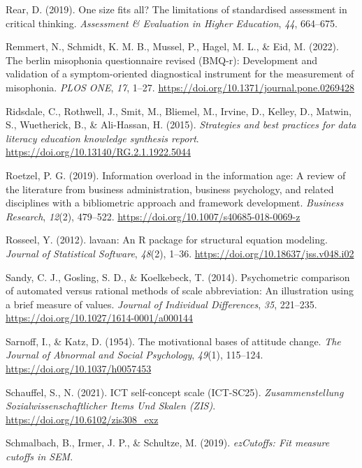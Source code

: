 \documentclass[
  12pt,
  a4paper,
  twoside]{article}
\newlength{\cslhangindent}
\newenvironment{CSLReferences}[2] %
 {\begin{list}{}{%
  \setlength{\itemindent}{0pt}
  \setlength{\leftmargin}{0pt}
  \setlength{\parsep}{0pt}
  \ifodd #1
   \setlength{\leftmargin}{\cslhangindent}
   \setlength{\itemindent}{-1\cslhangindent}
  \fi
  \setlength{\itemsep}{#2\baselineskip}}}
 {\end{list}}
\begin{document}
\begin{CSLReferences}{1}{0}
Rear, D. (2019). One size fits all? The limitations of standardised assessment in critical thinking. \emph{Assessment \& Evaluation in Higher Education}, \emph{44}, 664--675.

Remmert, N., Schmidt, K. M. B., Mussel, P., Hagel, M. L., \& Eid, M. (2022). The berlin misophonia questionnaire revised (BMQ-r): Development and validation of a symptom-oriented diagnostical instrument for the measurement of misophonia. \emph{PLOS ONE}, \emph{17}, 1--27. \url{https://doi.org/10.1371/journal.pone.0269428}

Ridsdale, C., Rothwell, J., Smit, M., Bliemel, M., Irvine, D., Kelley, D., Matwin, S., Wuetherick, B., \& Ali-Hassan, H. (2015). \emph{Strategies and best practices for data literacy education knowledge synthesis report}. \url{https://doi.org/10.13140/RG.2.1.1922.5044}

Roetzel, P. G. (2019). Information overload in the information age: A review of the literature from business administration, business psychology, and related disciplines with a bibliometric approach and framework development. \emph{Business Research}, \emph{12}(2), 479--522. \url{https://doi.org/10.1007/s40685-018-0069-z}

Rosseel, Y. (2012). {lavaan}: An {R} package for structural equation modeling. \emph{Journal of Statistical Software}, \emph{48}(2), 1--36. \url{https://doi.org/10.18637/jss.v048.i02}

Sandy, C. J., Gosling, S. D., \& Koelkebeck, T. (2014). Psychometric comparison of automated versus rational methods of scale abbreviation: An illustration using a brief measure of values. \emph{Journal of Individual Differences}, \emph{35}, 221--235. \url{https://doi.org/10.1027/1614-0001/a000144}

Sarnoff, I., \& Katz, D. (1954). The motivational bases of attitude change. \emph{The Journal of Abnormal and Social Psychology}, \emph{49}(1), 115--124. \url{https://doi.org/10.1037/h0057453}

Schauffel, S., N. (2021). ICT self-concept scale (ICT-SC25). \emph{Zusammenstellung Sozialwissenschaftlicher Items Und Skalen (ZIS)}. \url{https://doi.org/10.6102/zis308_exz}

Schmalbach, B., Irmer, J. P., \& Schultze, M. (2019). \emph{ezCutoffs: Fit measure cutoffs in SEM}.


\end{CSLReferences}
\end{document}
